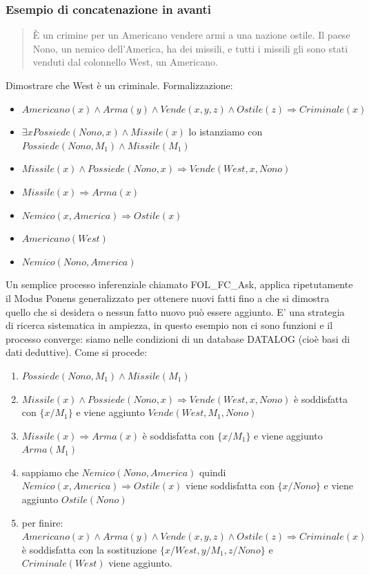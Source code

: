\documentclass{article}
\begin{document}
\subsubsection{Esempio di concatenazione in avanti}
\begin{quote}
    È un crimine per un Americano vendere armi a una nazione ostile. Il paese Nono, un nemico dell’America, ha dei missili, e tutti i missili gli sono stati venduti dal colonnello West, un Americano.
\end{quote}
\clearpage
Dimostrare che West è un criminale.
Formalizzazione:
\begin{itemize}
    \item $Americano(x) \land Arma(y) \land Vende(x, y, z) \land Ostile(z) \Rightarrow Criminale(x)$
    \item $\exists x Possiede(Nono,x) \land Missile(x)$ lo istanziamo con $Possiede(Nono, M_1) \land Missile(M_1)$
    \item $Missile(x) \land Possiede(Nono,x) \Rightarrow Vende(West, x, Nono)$
    \item $Missile(x) \Rightarrow Arma(x)$
    \item $Nemico(x, America) \Rightarrow Ostile(x)$
    \item $Americano(West)$
    \item $Nemico(Nono, America)$
\end{itemize}
Un semplice processo inferenziale chiamato FOL\_FC\_Ask, applica ripetutamente il Modus Ponens generalizzato per ottenere nuovi fatti fino a che si dimostra quello che si desidera o nessun fatto nuovo può essere aggiunto. E' una strategia di ricerca sistematica in ampiezza, in questo esempio non ci sono funzioni e il processo converge: siamo nelle condizioni di un database DATALOG (cioè basi di dati deduttive).
Come si procede:
\begin{enumerate}
    \item $Possiede(Nono, M_1) \land Missile(M_1)$
    \item $Missile(x) \land Possiede(Nono,x) \Rightarrow Vende(West,x,Nono)$ è soddisfatta con $\{x/M_1\}$ e viene aggiunto $Vende(West, M_1, Nono)$
    \item $Missile(x) \Rightarrow Arma(x)$ è soddisfatta con $\{x/M_1\}$ e viene aggiunto $Arma(M_1)$
    \item sappiamo che $Nemico(Nono, America)$ quindi $Nemico(x, America) \Rightarrow Ostile(x)$ viene soddisfatta con $\{x/Nono\}$ e viene aggiunto $Ostile(Nono)$
    \item per finire: $Americano(x) \land Arma(y) \land Vende(x, y, z) \land Ostile(z) \Rightarrow Criminale(x)$ è soddisfatta con la sostituzione $\{x/West, y/M_1, z/Nono\}$ e $Criminale(West)$ viene aggiunto.
\end{enumerate}
\end{document}
